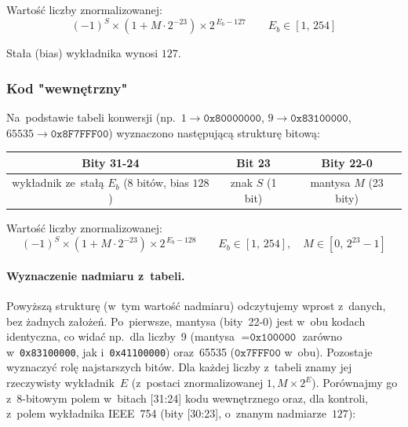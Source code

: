 \documentclass[12pt,a4paper]{article}
\begin{document}
Wartość liczby znormalizowanej:
\[
  (-1)^S \times (1 + M \cdot 2^{-23}) \times 2^{\,E_b - 127}
  \qquad E_b \in [1,\,254]
\]

Stała (bias) wykładnika wynosi $127$.

\subsubsection*{Kod "wewnętrzny"}

Na~podstawie tabeli konwersji (np.\ $1 \to \texttt{0x80000000}$,
$9 \to \texttt{0x83100000}$, $65535 \to \texttt{0x8F7FFF00}$) wyznaczono
następującą strukturę bitową:

\begin{center}
\begin{tabular}{|c|c|c|}
\hline
\textbf{Bity 31-24} & \textbf{Bit 23} & \textbf{Bity 22-0} \\
\hline
wykładnik ze~stałą $E_b$ (8 bitów, bias $128$) & znak $S$ (1 bit) & mantysa $M$ (23 bity) \\
\hline
\end{tabular}
\end{center}

Wartość liczby znormalizowanej:
\[
  (-1)^S \times (1 + M \cdot 2^{-23}) \times 2^{\,E_b - 128}
  \qquad E_b \in [1,\,254],\quad M \in [0,\,2^{23}-1]
\]

\paragraph{Wyznaczenie nadmiaru z~tabeli.}
Powyższą strukturę (w~tym wartość nadmiaru) odczytujemy wprost z~danych,
bez żadnych założeń. Po~pierwsze, mantysa (bity~22-0) jest w~obu kodach
identyczna, co widać np.\ dla liczby~9 (mantysa $=\texttt{0x100000}$ zarówno
w~\texttt{0x83100000}, jak i~\texttt{0x41100000}) oraz~65535
($\texttt{0x7FFF00}$ w~obu). Pozostaje wyznaczyć rolę najstarszych bitów.
Dla każdej liczby z~tabeli znamy jej rzeczywisty wykładnik~$E$ (z~postaci
znormalizowanej $1{,}M \times 2^E$). Porównajmy go z~8-bitowym polem w~bitach
[31:24] kodu wewnętrznego oraz, dla kontroli, z~polem wykładnika IEEE~754
(bity [30:23], o~znanym nadmiarze~$127$):
\end{document}
